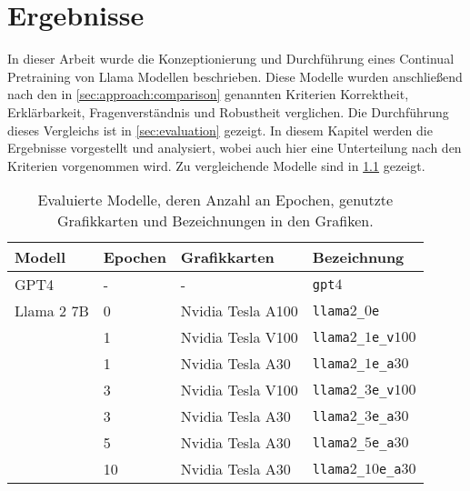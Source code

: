 \chapter{Ergebnisse}\label{ch:results}
\newcommand{\gpt}{\texttt{gpt$4$}}
\newcommand{\lo}{\texttt{llama$2$\_$0$e}}
\newcommand{\liv}{\texttt{llama$2$\_$1$e\_v$100$}}
\newcommand{\lia}{\texttt{llama$2$\_$1$e\_a$30$}}
\newcommand{\lev}{\texttt{llama$2$\_$3$e\_v$100$}}
\newcommand{\lea}{\texttt{llama$2$\_$3$e\_a$30$}}
\newcommand{\lsa}{\texttt{llama$2$\_$5$e\_a$30$}}
\newcommand{\lioa}{\texttt{llama$2$\_$10$e\_a$30$}}

\newcommand{\pic}[4][1]{
    \begin{figure}
        \makebox[\textwidth][c]{\texttt{[image: \#2]}}
        \caption{#3}
        \label{#4}
    \end{figure}
}

In dieser Arbeit wurde die Konzeptionierung und Durchführung eines Continual Pretraining von Llama Modellen beschrieben.
Diese Modelle wurden anschließend nach den in \cref{sec:approach:comparison} genannten Kriterien Korrektheit, Erklärbarkeit, Fragenverständnis und Robustheit verglichen.
Die Durchführung dieses Vergleichs ist in \cref{sec:evaluation} gezeigt.
In diesem Kapitel werden die Ergebnisse vorgestellt und analysiert, wobei auch hier eine Unterteilung nach den Kriterien vorgenommen wird.
Zu vergleichende Modelle sind in \cref{tab:eval-models} gezeigt.

\begin{table}
    \centering
    \begin{tabular}{llll}
        \toprule
        \textbf{Modell} & \textbf{Epochen} & \textbf{Grafikkarten} & \textbf{Bezeichnung} \\
        \midrule
        GPT4            & -                & -                     & \gpt                 \\
        Llama 2 7B      & 0                & Nvidia Tesla A100     & \lo                  \\
                        & 1                & Nvidia Tesla V100     & \liv                 \\
                        & 1                & Nvidia Tesla A30      & \lia                 \\
                        & 3                & Nvidia Tesla V100     & \lev                 \\
                        & 3                & Nvidia Tesla A30      & \lea                 \\
                        & 5                & Nvidia Tesla A30      & \lsa                 \\
                        & 10               & Nvidia Tesla A30      & \lioa                \\
        \bottomrule
    \end{tabular}
    \caption[Evaluierte Modelle]{Evaluierte Modelle, deren Anzahl an Epochen, genutzte Grafikkarten und Bezeichnungen in den Grafiken.}\label{tab:eval-models}
\end{table}

